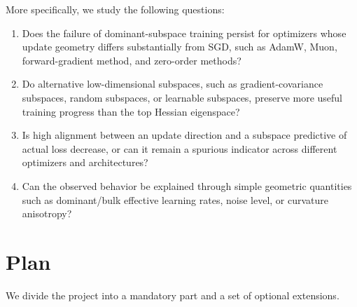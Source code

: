 \documentclass[conference]{IEEEtran}
\begin{document}
More specifically, we study the following questions:

\begin{enumerate}
    \item Does the failure of dominant-subspace training persist for optimizers whose update geometry differs substantially from SGD, such as AdamW, Muon, forward-gradient method, and zero-order methods?
    
    \item Do alternative low-dimensional subspaces, such as gradient-covariance subspaces, random subspaces, or learnable subspaces, preserve more useful training progress than the top Hessian eigenspace?
    
    \item Is high alignment between an update direction and a subspace predictive of actual loss decrease, or can it remain a spurious indicator across different optimizers and architectures?
    
    \item Can the observed behavior be explained through simple geometric quantities such as dominant/bulk effective learning rates, noise level, or curvature anisotropy?
\end{enumerate}


\section{Plan}
We divide the project into a mandatory part and a set of optional extensions.
\end{document}
